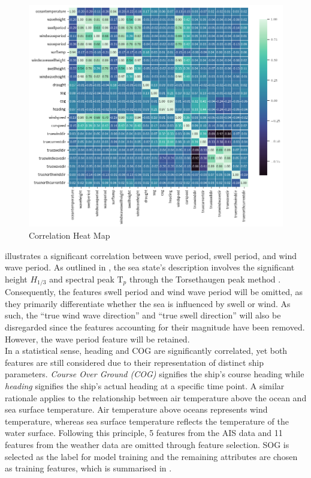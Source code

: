 \begin{figure}[h!]
    \centering
    \includegraphics[width=.9\linewidth,height=.9\textheight,keepaspectratio]{02_figures/heatmap_corr_ovr.png}
    \caption{Correlation Heat Map}
    \label{fig:heatmap_ovr}
\end{figure}

 illustrates a significant correlation between wave period, swell period, and wind wave period. As outlined in , the sea state's description involves the significant height $H_{1/3}$ and spectral peak $\text{T}_p$ through the Torsethaugen peak method . Consequently, the features swell period and wind wave period will be omitted, as they primarily differentiate whether the sea is influenced by swell or wind. As such, the ``true wind wave direction'' and ``true swell direction'' will also be disregarded since the features accounting for their magnitude have been removed.  However, the wave period feature will be retained.\\

In a statistical sense, heading and COG are significantly correlated, yet both features are still considered due to their representation of distinct ship parameters. \emph{Course Over Ground (COG)} signifies the ship's course heading while \emph{heading} signifies the ship's actual heading at a specific time point. A similar rationale applies to the relationship between air temperature above the ocean and sea surface temperature. Air temperature above oceans represents wind temperature, whereas sea surface temperature reflects the temperature of the water surface. Following this principle, 5 features from the AIS data and 11 features from the weather data are omitted through feature selection. SOG is selected as the label for model training and the remaining attributes are chosen as training features, which is summarised in .\\

